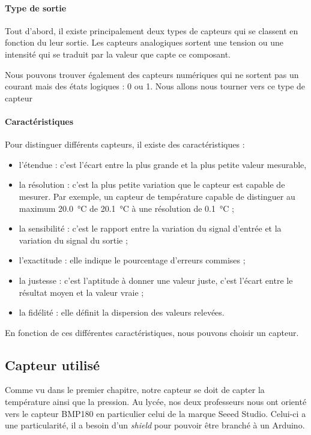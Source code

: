 \paragraph{Type de sortie} Tout d'abord, il existe principalement deux types de capteurs qui se classent en fonction du leur sortie. Les capteurs analogiques sortent une tension ou une intensité qui se traduit par la valeur que capte ce composant.

Nous pouvons trouver également des capteurs numériques qui ne sortent pas un courant mais des états logiques : 0 ou 1. Nous allons nous tourner vers ce type de capteur

\paragraph{Caractéristiques} Pour distinguer différents capteurs, il existe des caractéristiques :
\begin{itemize}
	\item l'étendue : c'est l'écart entre la plus grande et la plus petite valeur mesurable,
	\item la résolution : c'est la plus petite variation que le capteur est capable de mesurer. Par exemple, un capteur de température capable de distinguer au maximum \SI{20,0}{\celsius} de \SI{20,1}{\celsius} à une résolution de \SI{0,1}{\celsius} ;
	\item la sensibilité : c'est le rapport entre la variation du signal d'entrée et la variation du signal du sortie ;
	\item l'exactitude : elle indique le pourcentage d'erreurs commises ;
	\item la justesse : c'est l'aptitude à donner une valeur juste, c'est l'écart entre le résultat moyen et la valeur vraie ;
	\item la fidélité : elle définit la dispersion des valeurs relevées.
\end{itemize}

En fonction de ces différentes caractéristiques, nous pouvons choisir un capteur.

\subsection{Capteur utilisé}

Comme vu dans le premier chapitre, notre capteur se doit de capter la température ainsi que la pression. Au lycée, nos deux professeurs nous ont orienté vers le capteur BMP180 en particulier celui de la marque Seeed Studio. Celui-ci a une particularité, il a besoin d'un \emph{shield} pour pouvoir être branché à un Arduino.

